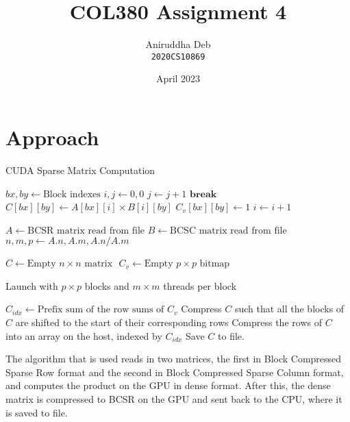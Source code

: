 \documentclass[12pt]{article}
\title{\textbf{COL380 Assignment 4}}
\author{Aniruddha Deb \\ \texttt{2020CS10869}}
\date{April 2023}
\begin{document}
\maketitle

\section{Approach}

\begin{algorithm}[!htbp]
\caption{CUDA Sparse Matrix Computation}\label{alg:cap}
\begin{algorithmic}[1]
        \State $bx, by \gets \text{Block indexes}$
        \State $i, j \gets 0, 0$
                \State $j \gets j+1$
            \EndWhile
                \State $\textbf{break}$
            \EndIf
            \State $C[bx][by] \gets A[bx][i] \times B[i][by]$
            \State $C_v[bx][by] \gets 1$
            \State $i \gets i+1$
        \EndWhile
    \EndProcedure
    \item[]

    \State $A \gets \text{BCSR matrix read from file}$
    \State $B \gets \text{BCSC matrix read from file}$
    \State $n, m, p \gets A.n, A.m, A.n/A.m$
    \item[]
    \State $C \gets \text{Empty }n \times n\text{ matrix }$
    \State $C_v \gets \text{Empty }p \times p\text{ bitmap }$
    \item[]
        \State Launch  with $p \times p$ blocks and $m \times m$ threads per block
    \item[]
    \State $C_{idx} \gets \text{Prefix sum of the row sums of }C_v$
    \State Compress $C$ such that all the blocks of $C$ are shifted to the start 
    of their corresponding rows
    \State Compress the rows of $C$ into an array on the host, indexed by $C_{idx}$
    \State Save $C$ to file.
\end{algorithmic}
\end{algorithm}

The algorithm that is used reads in two matrices, the first in Block Compressed 
Sparse Row format and the second in Block Compressed Sparse Column format, and 
computes the product on the GPU in dense format. After this, the dense matrix is 
compressed to BCSR on the GPU and sent back to the CPU, where it is saved to 
file.
\end{document}
